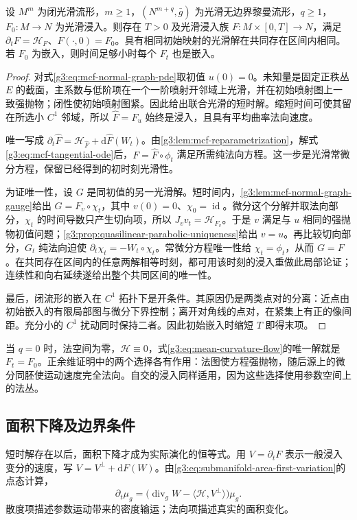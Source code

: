 \begin{theorem}\label{g3:thm:mcf-short-time}
	设 \(M^m\) 为闭光滑流形，\(m\ge1\)，\((N^{m+q},\bar g)\) 为光滑无边界黎曼流形，\(q\ge1\)，\(F_0:M\to N\) 为光滑浸入。则存在 \(T>0\) 及光滑浸入族 \(F:M\times[0,T]\to N\)，满足
	\(\partial_tF=\mathcal H_F\)、\(F(\cdot,0)=F_0\)。具有相同初始映射的光滑解在共同存在区间内相同。若 \(F_0\) 为嵌入，则时间足够小时每个 \(F_t\) 也是嵌入。
\end{theorem}
\begin{proof}
	对式\eqref{g3:eq:mcf-normal-graph-pde}取初值 \(u(0)=0\)。未知量是固定正秩丛 \(E\) 的截面，主系数与低阶项在一个一阶喷射开邻域上光滑，并在初始喷射图上一致强抛物；闭性使初始喷射图紧。因此给出联合光滑的短时解。缩短时间可使其留在所选小 \(C^1\) 邻域，所以 \(\widehat F=F_u\) 始终是浸入，且具有平均曲率法向速度。

	唯一写成
	\(\partial_t\widehat F=\mathcal H_{\widehat F}+\mathrm d\widehat F(W_t)\)。由\cref{g3:lem:mcf-reparametrization}，解式\eqref{g3:eq:mcf-tangential-ode}后，\(F=\widehat F\circ\phi_t\) 满足所需纯法向方程。这一步是光滑常微分方程，保留已经得到的初时刻光滑性。

	为证唯一性，设 \(G\) 是同初值的另一光滑解。短时间内，\cref{g3:lem:mcf-normal-graph-gauge}给出 \(G=F_v\circ\chi_t\)，其中 \(v(0)=0\)、\(\chi_0=\operatorname{id}\)。微分这个分解并取法向部分，\(\chi_t\) 的时间导数只产生切向项，所以
	\(J_v v_t=\mathcal H_{F_v}\)。于是 \(v\) 满足与 \(u\) 相同的强抛物初值问题；\cref{g3:prop:quasilinear-parabolic-uniqueness}给出 \(v=u\)。再比较切向部分，\(G_t\) 纯法向迫使
	\(\partial_t\chi_t=-W_t\circ\chi_t\)。常微分方程唯一性给 \(\chi_t=\phi_t\)，从而 \(G=F\)。在共同存在区间内的任意两解相等时刻，都可用该时刻的浸入重做此局部论证；连续性和向右延续遂给出整个共同区间的唯一性。

	最后，闭流形的嵌入在 \(C^1\) 拓扑下是开条件。其原因仍是两类点对的分离：近点由初始嵌入的有限局部图与微分下界控制；离开对角线的点对，在紧集上有正的像间距。充分小的 \(C^1\) 扰动同时保持二者。因此初始嵌入时缩短 \(T\) 即得末项。
\end{proof}

当 \(q=0\) 时，法空间为零，\(\mathcal H\equiv0\)，式\eqref{g3:eq:mean-curvature-flow}的唯一解就是 \(F_t=F_0\)。正余维证明中的两个选择各有作用：法图使方程强抛物，随后源上的微分同胚使运动速度完全法向。自交的浸入同样适用，因为这些选择使用参数空间上的法丛。

\subsection{面积下降及边界条件}
\label{g3:subsec:2801:04}
短时解存在以后，面积下降才成为实际演化的恒等式。用 \(V=\partial_tF\) 表示一般浸入变分的速度，写 \(V=V^\perp+\mathrm dF(W)\)。由\cref{g3:eq:submanifold-area-first-variation}的点态计算，
\begin{equation}\label{g3:eq:mcf-general-area-density}
	\partial_t\mu_g
	=\bigl(\operatorname{div}_gW-\langle\mathcal H,V^\perp\rangle\bigr)\mu_g.
\end{equation}
散度项描述参数运动带来的密度输运；法向项描述真实的面积变化。

